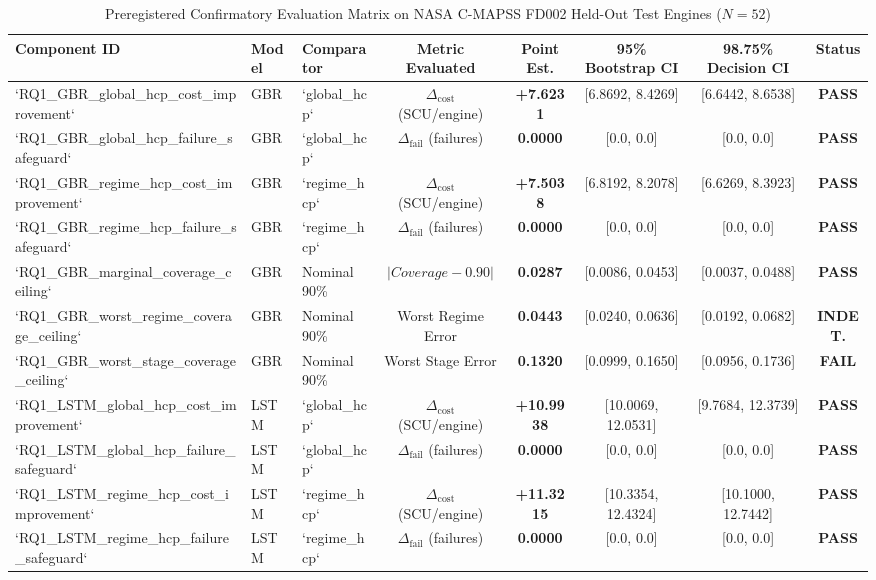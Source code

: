 \documentclass[conference]{IEEEtran}
\newcommand{\Deltacost}{\Delta_{\text{cost}}}
\newcommand{\Deltafail}{\Delta_{\text{fail}}}
\begin{document}
\begin{table}[t]
\caption{Preregistered Confirmatory Evaluation Matrix on NASA C-MAPSS FD002 Held-Out Test Engines ($N=52$)}
\label{tab:confirmatory_results}
\centering
\begin{tabular}{lllccccc}
\toprule
\textbf{Component ID} & \textbf{Model} & \textbf{Comparator} & \textbf{Metric Evaluated} & \textbf{Point Est.} & \textbf{95\% Bootstrap CI} & \textbf{98.75\% Decision CI} & \textbf{Status} \\
\midrule
`RQ1_GBR_global_hcp_cost_improvement` & GBR & `global_hcp` & $\Deltacost$ (SCU/engine) & \textbf{+7.6231} & [6.8692, 8.4269] & [6.6442, 8.6538] & \textbf{PASS} \\
`RQ1_GBR_global_hcp_failure_safeguard` & GBR & `global_hcp` & $\Deltafail$ (failures) & \textbf{0.0000} & [0.0, 0.0] & [0.0, 0.0] & \textbf{PASS} \\
`RQ1_GBR_regime_hcp_cost_improvement` & GBR & `regime_hcp` & $\Deltacost$ (SCU/engine) & \textbf{+7.5038} & [6.8192, 8.2078] & [6.6269, 8.3923] & \textbf{PASS} \\
`RQ1_GBR_regime_hcp_failure_safeguard` & GBR & `regime_hcp` & $\Deltafail$ (failures) & \textbf{0.0000} & [0.0, 0.0] & [0.0, 0.0] & \textbf{PASS} \\
`RQ1_GBR_marginal_coverage_ceiling` & GBR & Nominal 90\% & $|Coverage - 0.90|$ & \textbf{0.0287} & [0.0086, 0.0453] & [0.0037, 0.0488] & \textbf{PASS} \\
`RQ1_GBR_worst_regime_coverage_ceiling`& GBR & Nominal 90\% & Worst Regime Error & \textbf{0.0443} & [0.0240, 0.0636] & [0.0192, 0.0682] & \textbf{INDET.} \\
`RQ1_GBR_worst_stage_coverage_ceiling` & GBR & Nominal 90\% & Worst Stage Error & \textbf{0.1320} & [0.0999, 0.1650] & [0.0956, 0.1736] & \textbf{FAIL} \\
\midrule
`RQ1_LSTM_global_hcp_cost_improvement` & LSTM & `global_hcp` & $\Deltacost$ (SCU/engine) & \textbf{+10.9938} & [10.0069, 12.0531] & [9.7684, 12.3739] & \textbf{PASS} \\
`RQ1_LSTM_global_hcp_failure_safeguard` & LSTM & `global_hcp` & $\Deltafail$ (failures) & \textbf{0.0000} & [0.0, 0.0] & [0.0, 0.0] & \textbf{PASS} \\
`RQ1_LSTM_regime_hcp_cost_improvement` & LSTM & `regime_hcp` & $\Deltacost$ (SCU/engine) & \textbf{+11.3215} & [10.3354, 12.4324] & [10.1000, 12.7442] & \textbf{PASS} \\
`RQ1_LSTM_regime_hcp_failure_safeguard` & LSTM & `regime_hcp` & $\Deltafail$ (failures) & \textbf{0.0000} & [0.0, 0.0] & [0.0, 0.0] & \textbf{PASS} \\

\end{tabular}
\end{table}
\end{document}
